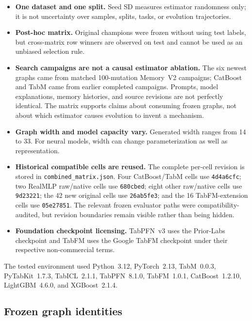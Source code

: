 \documentclass[10pt]{article}
\newcommand{\code}[1]{\texttt{#1}}
\begin{document}
\begin{itemize}
  \item \textbf{One dataset and one split.}  Seed SD measures estimator
  randomness only; it is not uncertainty over samples, splits, tasks, or
  evolution trajectories.
  \item \textbf{Post-hoc matrix.}  Original champions were frozen without
  using test labels, but cross-matrix row winners are observed on test and
  cannot be used as an unbiased selection rule.
  \item \textbf{Search campaigns are not a causal estimator ablation.}  The
  six newest graphs came from matched 100-mutation Memory~V2 campaigns;
  CatBoost and TabM came from earlier completed campaigns.  Prompts, model
  explanations, memory histories, and source revisions are not perfectly
  identical.  The matrix supports claims about consuming frozen graphs, not
  about which estimator causes evolution to invent a mechanism.
  \item \textbf{Graph width and model capacity vary.}  Generated width ranges
  from 14 to 33.  For neural models, width can change parameterization as well
  as representation.
  \item \textbf{Historical compatible cells are reused.}  The complete
  per-cell revision is stored in \code{combined\_matrix.json}.  Four
  CatBoost/TabM cells use \code{4d4a6cfc}; two RealMLP raw/native cells use
  \code{680cbed}; eight other raw/native cells use \code{9d23221}; the 42 new
  original cells use \code{26ab5fe3}; and the 16 TabFM-extension cells use
  \code{05e27851}.  The relevant frozen evaluator paths were
  compatibility-audited, but revision boundaries remain visible rather than
  being hidden.
  \item \textbf{Foundation checkpoint licensing.}  TabPFN~v3 uses the
  Prior-Labs checkpoint and TabFM uses the Google TabFM checkpoint under
  their respective non-commercial terms.
\end{itemize}

The tested environment used Python~3.12, PyTorch~2.13, TabM~0.0.3,
PyTabKit~1.7.3, TabICL~2.1.1, TabPFN~8.1.0, TabFM~1.0.1,
CatBoost~1.2.10, LightGBM~4.6.0, and XGBoost~2.1.4.

\subsection{Frozen graph identities}
\end{document}

